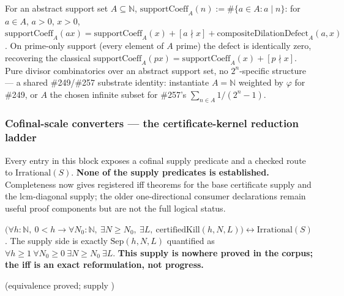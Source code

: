 \begin{prop}
For an abstract support set $A\subseteq\mathbb{N}$, $\mathrm{supportCoeff}_A(n) := \#\{a\in A: a\mid n\}$: for $a\in A$, $a>0$, $x>0$, $\mathrm{supportCoeff}_A(ax) = \mathrm{supportCoeff}_A(x) + [a\nmid x] + \mathrm{compositeDilationDefect}_A(a,x)$. On prime-only support (every element of $A$ prime) the defect is identically zero, recovering the classical $\mathrm{supportCoeff}_A(px) = \mathrm{supportCoeff}_A(x) + [p\nmid x]$. Pure divisor combinatorics over an abstract support set, no $2^n$-specific structure — a shared \#249/\#257 substrate identity: instantiate $A=\mathbb{N}$ weighted by $\varphi$ for \#249, or $A$ the chosen infinite subset for \#257's $\sum_{n\in A}1/(2^n-1)$.
\par\noindent{}     
\end{prop}

\subsubsection{Cofinal-scale converters — the certificate-kernel reduction ladder}

Every entry in this block exposes a cofinal supply predicate and a checked
route to $\mathrm{Irrational}(S)$. \textbf{None of the supply predicates is
established.}  Completeness now gives registered iff theorems for the base
certificate supply and the lcm-diagonal supply; the older one-directional
consumer declarations remain useful proof components but are not the full
logical status.

\begin{thm}
$\big(\forall h:\mathbb{N},\ 0<h \to \forall N_0:\mathbb{N},\ \exists N\ge N_0,\ \exists L,\ \mathrm{certifiedKill}(h,N,L)\big) \leftrightarrow \mathrm{Irrational}(S)$. The supply side is exactly $\mathrm{Sep}(h,N,L)$ quantified as $\forall h\ge1\ \forall N_0\ge0\ \exists N\ge N_0\ \exists L$. \textbf{This supply is nowhere proved in the corpus; the iff is an exact reformulation, not progress.}
\par\noindent{} (equivalence proved; supply )   
\end{thm}

